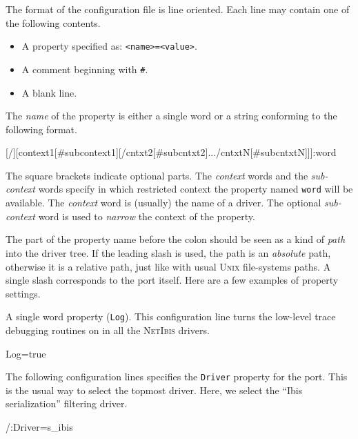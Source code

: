 \documentclass[11pt]{book}
\def\NetIbis{\textsc{NetIbis}\xspace}
\begin{document}
The format of the configuration file is line oriented. Each line may
contain one of the following contents.

\begin{itemize}
\item A property specified as: \texttt{<name>=<value>}.
\item A comment beginning with \texttt{\#}.
\item A blank line.
\end{itemize}

The \emph{name} of the
property is either a single word or a string conforming to the
following format.

\begin{Miniverb}

  [/][context1[#subcontext1][/cntxt2[#subcntxt2].../cntxtN[#subcntxtN]]]:word

\end{Miniverb}

The square brackets indicate optional parts. The \emph{context} words and the
\emph{sub-context}\label{subcontext} words specify in which restricted context the property
named \texttt{word} will be available. The \emph{context} word is
(usually) the name of a driver. The optional \emph{sub-context} word is
used to \emph{narrow} the context of the property.

The part of the property name before the colon should be seen as a
kind of \emph{path} into the driver tree. If the leading slash is
used, the path is an \emph{absolute} path, otherwise it is a relative
path, just like with usual \textsc{Unix} file-systems paths. A single
slash corresponds to the port itself. Here are a few examples of
property settings.

A single word property (\texttt{Log}). This configuration line turns
the low-level trace debugging routines on in all the \NetIbis drivers.
\begin{Miniverb}

  Log=true

\end{Miniverb}

The following configuration lines specifies the \texttt{Driver}
property for the port. This is the usual way to select the topmost
driver. Here, we select the ``Ibis serialization'' filtering driver.
\begin{Miniverb}

  /:Driver=s_ibis

\end{Miniverb}
\end{document}
